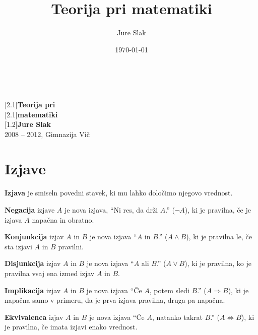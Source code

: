 \documentclass[a4paper,oneside,12pt,fleqn]{article}
\title{Teorija pri matematiki}
\author{Jure Slak}
\date{\today}
\renewcommand\implies\Rightarrow
\renewcommand\iff\Leftrightarrow
\numberwithin{equation}{section}
\begin{document}
\setlength{\abovedisplayskip}{3pt}
\setlength{\belowdisplayskip}{6pt}

\renewcommand{\listfigurename}{Kazalo slik} 

\thispagestyle{empty}

\mbox{}\\
\vspace{3ex}

\noindent \scalebox{1.8}[2.1]{\textsf{{\Huge \bfseries Teorija pri}}} \\[5pt]
\scalebox{1.8}[2.1]{\textsf{{\Huge \bfseries matematiki}}} \\[60pt]
\scalebox{1}[1.2]{\textsf{\Huge \bfseries Jure Slak}} \\[45pt]
\textsf{2008 -- 2012, Gimnazija Vič}

\vspace{-10pt}
\noindent \mbox{} \hspace{-20pt} 

\vfill
\hfill
\vspace{-5ex}

\pagebreak

\thispagestyle{empty}
\tableofcontents
\pagebreak

\section{Izjave}
\label{sec:izjave}
\textbf{Izjava} je smiseln povedni stavek, ki mu lahko določimo njegovo vrednost.

\textbf{Negacija} izjave $A$ je nova izjava, ``Ni res, da drži $A$.'' ($\neg A$), ki je pravilna, če je izjava $A$
napačna in obratno. 

\textbf{Konjunkcija} izjav $A$ in $B$ je nova izjava ``$A$ in $B$.'' ($A \land
B$), ki je pravilna le, če sta izjavi $A$ in $B$ pravilni.

\textbf{Disjunkcija} izjav $A$ in $B$ je nova izjava ``$A$ ali $B$.'' ($A \lor B$), 
ki je pravilna, ko je pravilna vsaj ena izmed izjav $A$ in $B$.

\textbf{Implikacija} izjav $A$ in $B$ je nova izjava ``Če $A$, potem sledi $B$.'' ($A
\implies B$), ki je napačna samo v primeru, da je prva izjava pravilna, druga pa napačna.

\textbf{Ekvivalenca} izjav $A$ in $B$ je nova izjava ``Če $A$, natanko takrat $B$.'' ($A 
\iff B$), ki je pravilna, če imata izjavi enako vrednost.
\end{document}
